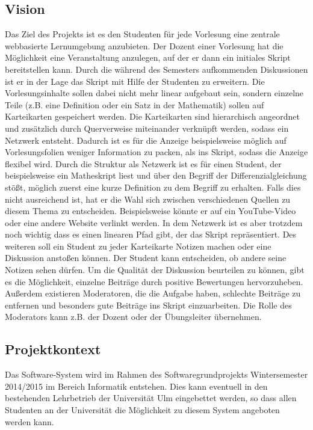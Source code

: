 \documentclass[12pt,a4paper]{article}
\begin{document}
\subsection{Vision}
Das Ziel des Projekts ist es den Studenten für jede Vorlesung eine zentrale webbasierte Lernumgebung anzubieten. Der Dozent einer Vorlesung hat die Möglichkeit eine Veranstaltung anzulegen, auf der er dann ein initiales Skript bereitstellen kann. Durch die während des Semesters aufkommenden Diskussionen ist er in der Lage das Skript mit Hilfe der Studenten zu erweitern. Die Vorlesungsinhalte sollen dabei nicht mehr linear aufgebaut sein, sondern einzelne Teile (z.B. eine Definition oder ein Satz in der Mathematik) sollen auf Karteikarten gespeichert werden. Die Karteikarten sind hierarchisch angeordnet und zusätzlich durch Querverweise miteinander verknüpft werden, sodass ein Netzwerk entsteht. Dadurch ist es für die Anzeige beispielsweise möglich auf Vorlesungsfolien weniger Information zu packen, als ins Skript, sodass die Anzeige flexibel wird. Durch die Struktur als Netzwerk ist es für einen Student, der beispielsweise ein Matheskript liest und über den Begriff der Differenzialgleichung stößt, möglich zuerst eine kurze Definition zu dem Begriff zu erhalten. Falls dies nicht ausreichend ist, hat er die Wahl sich zwischen verschiedenen Quellen zu diesem Thema zu entscheiden. Beispielsweise könnte er auf ein YouTube-Video oder eine andere Website verlinkt werden. In dem Netzwerk ist es aber trotzdem noch wichtig dass es einen linearen Pfad gibt, der das Skript repräsentiert. Des weiteren soll ein Student zu jeder Karteikarte Notizen machen oder eine Diskussion anstoßen können. Der Student kann entscheiden, ob andere seine Notizen sehen dürfen. Um die Qualität der Diskussion beurteilen zu können, gibt es die Möglichkeit, einzelne Beiträge durch positive Bewertungen hervorzuheben. Außerdem existieren Moderatoren, die die Aufgabe haben, schlechte Beiträge zu entfernen und besonders gute Beiträge ins Skript einzuarbeiten. Die Rolle des Moderators kann z.B. der Dozent oder der Übungsleiter übernehmen.

\subsection{Projektkontext}
Das Software-System wird im Rahmen des Softwaregrundprojekts Wintersemester 2014/2015 im Bereich Informatik entstehen. Dies kann eventuell in den bestehenden Lehrbetrieb der Universität Ulm eingebettet werden, so dass allen Studenten an der Universität die Möglichkeit zu diesem System angeboten werden kann.
\end{document}
